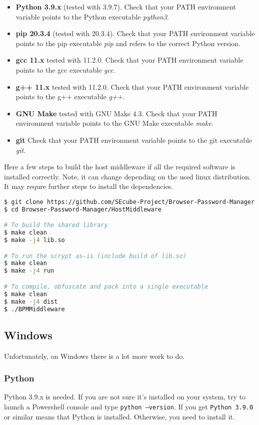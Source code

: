 \begin{itemize}
    \item \textbf{Python 3.9.x} (tested with 3.9.7). Check that your PATH environment variable points to the Python executable \textit{python3}.
    \item \textbf{pip 20.3.4} (tested with 20.3.4). Check that your PATH environment variable points to the pip executable \textit{pip} and refers to the correct Python version.
    \item \textbf{gcc 11.x} {tested with 11.2.0}. Check that your PATH environment variable points to the gcc executable \textit{gcc}.
    \item \textbf{g++ 11.x} {tested with 11.2.0}. Check that your PATH environment variable points to the g++ executable \textit{g++}.
    \item \textbf{GNU Make} {tested with GNU Make 4.3}. Check that your PATH environment variable points to the GNU Make executable \textit{make}.
    \item \textbf{git} Check that your PATH environment variable points to the git executable \textit{git}.
\end{itemize}

Here a few steps to build the host middleware if all the required software is installed correctly. Note, it can change depending on the used linux distribution. It may requre further steps to install the dependencies.

\begin{lstlisting}[language=bash,caption={bash version}]
$ git clone https://github.com/SEcube-Project/Browser-Password-Manager.git
$ cd Browser-Password-Manager/HostMiddleware

# To build the shared library
$ make clean
$ make -j4 lib.so

# To run the scrypt as-is (include build of lib.so)
$ make clean
$ make -j4 run

# To compile, obfuscate and pack into a single executable
$ make clean
$ make -j4 dist
$ ./BPMMiddleware

\end{lstlisting}


\subsection{Windows}
Unfortunately, on Windows there is a lot more work to do.

\subsubsection{Python}
Python 3.9.x is needed. If you are not sure it's installed on your system, try to launch a Powershell console and type \texttt{python --version}. If you get \texttt{Python 3.9.0} or similar means that Python is installed. Otherwise, you need to install it. \\

